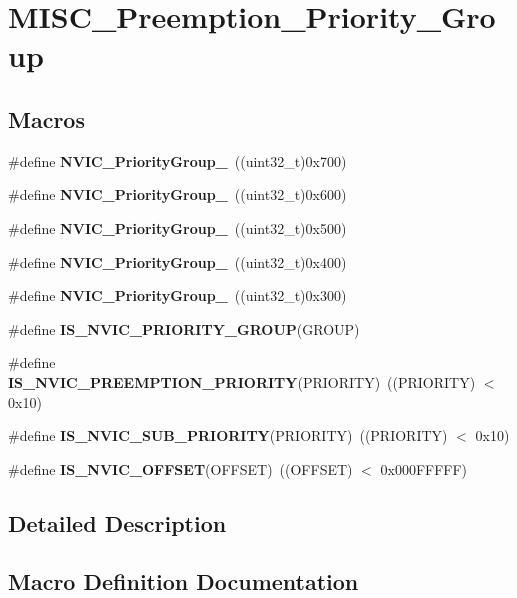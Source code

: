\section{M\+I\+S\+C\+\_\+\+Preemption\+\_\+\+Priority\+\_\+\+Group}
\label{group__MISC__Preemption__Priority__Group}
\subsection*{Macros}
\begin{DoxyCompactItemize}
\item 
\#define \textbf{ N\+V\+I\+C\+\_\+\+Priority\+Group\+\_}~((uint32\+\_\+t)0x700)
\item 
\#define \textbf{ N\+V\+I\+C\+\_\+\+Priority\+Group\+\_}~((uint32\+\_\+t)0x600)
\item 
\#define \textbf{ N\+V\+I\+C\+\_\+\+Priority\+Group\+\_}~((uint32\+\_\+t)0x500)
\item 
\#define \textbf{ N\+V\+I\+C\+\_\+\+Priority\+Group\+\_}~((uint32\+\_\+t)0x400)
\item 
\#define \textbf{ N\+V\+I\+C\+\_\+\+Priority\+Group\+\_}~((uint32\+\_\+t)0x300)
\item 
\#define \textbf{ I\+S\+\_\+\+N\+V\+I\+C\+\_\+\+P\+R\+I\+O\+R\+I\+T\+Y\+\_\+\+G\+R\+O\+UP}(G\+R\+O\+UP)
\item 
\#define \textbf{ I\+S\+\_\+\+N\+V\+I\+C\+\_\+\+P\+R\+E\+E\+M\+P\+T\+I\+O\+N\+\_\+\+P\+R\+I\+O\+R\+I\+TY}(P\+R\+I\+O\+R\+I\+TY)~((P\+R\+I\+O\+R\+I\+TY) $<$ 0x10)
\item 
\#define \textbf{ I\+S\+\_\+\+N\+V\+I\+C\+\_\+\+S\+U\+B\+\_\+\+P\+R\+I\+O\+R\+I\+TY}(P\+R\+I\+O\+R\+I\+TY)~((P\+R\+I\+O\+R\+I\+TY) $<$ 0x10)
\item 
\#define \textbf{ I\+S\+\_\+\+N\+V\+I\+C\+\_\+\+O\+F\+F\+S\+ET}(O\+F\+F\+S\+ET)~((O\+F\+F\+S\+ET) $<$ 0x000\+F\+F\+F\+F\+F)
\end{DoxyCompactItemize}


\subsection{Detailed Description}


\subsection{Macro Definition Documentation}
\mbox{\label{group__MISC__Preemption__Priority__Group_ga1184bbb97d758385f98ab40dd5e5af59}} 
